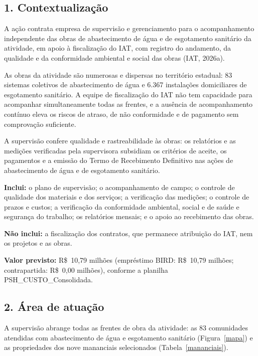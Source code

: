 
{}
\subsection*{1. Contextualização}

A ação contrata empresa de supervisão e gerenciamento para o acompanhamento independente das obras de abastecimento de água e de esgotamento sanitário da atividade, em apoio à fiscalização do IAT, com registro do andamento, da qualidade e da conformidade ambiental e social das obras (IAT, 2026a).

As obras da atividade são numerosas e dispersas no território estadual: 83 sistemas coletivos de abastecimento de água e 6.367 instalações domiciliares de esgotamento sanitário. A equipe de fiscalização do IAT não tem capacidade para acompanhar simultaneamente todas as frentes, e a ausência de acompanhamento contínuo eleva os riscos de atraso, de não conformidade e de pagamento sem comprovação suficiente.

A supervisão confere qualidade e rastreabilidade às obras: os relatórios e as medições verificadas pela supervisora subsidiam os critérios de aceite, os pagamentos e a emissão do Termo de Recebimento Definitivo nas ações de abastecimento de água e de esgotamento sanitário.

\textbf{Inclui:} o plano de supervisão; o acompanhamento de campo; o controle de qualidade dos materiais e dos serviços; a verificação das medições; o controle de prazos e custos; a verificação da conformidade ambiental, social e de saúde e segurança do trabalho; os relatórios mensais; e o apoio ao recebimento das obras.

\textbf{Não inclui:} a fiscalização dos contratos, que permanece atribuição do IAT, nem os projetos e as obras.

\textbf{Valor previsto:} R\$~10,79 milhões (empréstimo BIRD: R\$~10,79 milhões; contrapartida: R\$~0,00 milhões), conforme a planilha PSH\_CUSTO\_Consolidada.

{}
\subsection*{2. Área de atuação}

A supervisão abrange todas as frentes de obra da atividade: as 83 comunidades atendidas com abastecimento de água e esgotamento sanitário (Figura~\ref{mapa}) e as propriedades dos nove mananciais selecionados (Tabela~\ref{mananciais}).

